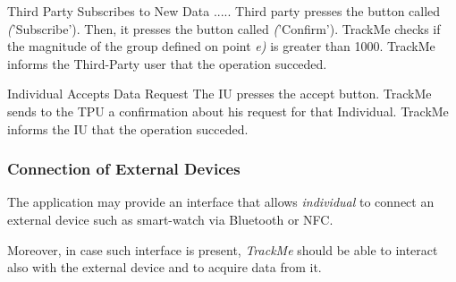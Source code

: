 \documentclass[a4paper]{article}
\begin{document}
        \begin{usecase}{Third Party Subscribes to New Data}
              {.....}
              {Third party presses the button called \textit('Subscribe'). Then, it presses the button called \textit('Confirm').}
              {TrackMe checks if the magnitude of the group defined on point \textit{e)} is greater than 1000.}
              {TrackMe informs the Third-Party user that the operation succeded.}
        \end{usecase}
        
        \begin{usecase}{Individual Accepts Data Request}
              {The IU presses the accept button.}
              {TrackMe sends to the TPU a confirmation about his request for that Individual.}
              {TrackMe informs the IU that the operation succeded.}
        \end{usecase}
        
        \subsubsection{Connection of External Devices}
        The application may provide an interface that allows \textit{individual} to connect an external device such as smart-watch via Bluetooth or NFC.
        
        Moreover, in case such interface is present, \textit{TrackMe} should be able to interact also with the external device and to acquire data from it.
        
\end{document}
